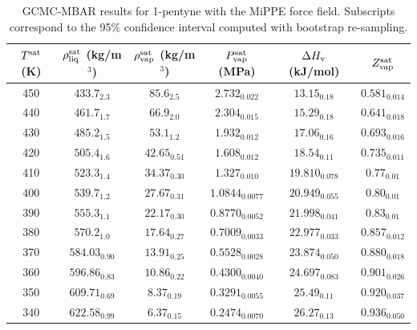\documentclass[journal=jctc,manuscript=article]{achemso}
\begin{document}
\begin{table}[htb!]
	\caption{GCMC-MBAR results for 1-pentyne with the MiPPE force field. Subscripts correspond to the 95\% confidence interval computed with bootstrap re-sampling.}
	\begin{center}
		\begin{tabular}{|c|c|c|c|c|c|}
			\hline
			$T^{\rm sat}$ (K) & $\rho_{\rm liq}^{\rm sat}$ (kg/m$^3$) & $\rho_{\rm vap}^{\rm sat}$ (kg/m$^3$) & $P_{\rm vap}^{\rm sat}$ (MPa) & $\Delta H_{\rm v}$ (kJ/mol) & $Z_{\rm vap}^{\rm sat}$ \\ \hline
			450 & $433.7_{2.3}$ & $85.6_{2.5}$ & $2.732_{0.022}$ & $13.15_{0.18}$ & $0.581_{0.014}$ \\
			440 & $461.7_{1.7}$ & $66.9_{2.0}$ & $2.304_{0.015}$ & $15.29_{0.18}$ & $0.641_{0.018}$ \\
			430 & $485.2_{1.5}$ & $53.1_{1.2}$ & $1.932_{0.012}$ & $17.06_{0.16}$ & $0.693_{0.016}$ \\
			420 & $505.4_{1.6}$ & $42.65_{0.51}$ & $1.608_{0.012}$ & $18.54_{0.11}$ & $0.735_{0.011}$ \\
			410 & $523.3_{1.4}$ & $34.37_{0.30}$ & $1.327_{0.010}$ & $19.810_{0.078}$ & $0.77_{0.01}$ \\
			400 & $539.7_{1.2}$ & $27.67_{0.31}$ & $1.0844_{0.0077}$ & $20.949_{0.055}$ & $0.80_{0.01}$ \\
			390 & $555.3_{1.1}$ & $22.17_{0.30}$ & $0.8770_{0.0052}$ & $21.998_{0.041}$ & $0.83_{0.01}$ \\
			380 & $570.2_{1.0}$ & $17.64_{0.27}$ & $0.7009_{0.0033}$ & $22.977_{0.033}$ & $0.857_{0.012}$ \\
			370 & $584.03_{0.90}$ & $13.91_{0.25}$ & $0.5528_{0.0028}$ & $23.874_{0.050}$ & $0.880_{0.018}$ \\
			360 & $596.86_{0.83}$ & $10.86_{0.22}$ & $0.4300_{0.0040}$ & $24.697_{0.083}$ & $0.901_{0.026}$ \\
			350 & $609.71_{0.69}$ & $8.37_{0.19}$ & $0.3291_{0.0055}$ & $25.49_{0.11}$ & $0.920_{0.037}$ \\
			340 & $622.58_{0.99}$ & $6.37_{0.15}$ & $0.2474_{0.0070}$ & $26.27_{0.13}$ & $0.936_{0.050}$ \\
			\hline
		\end{tabular}
	\end{center}
\end{table}
\end{document}
